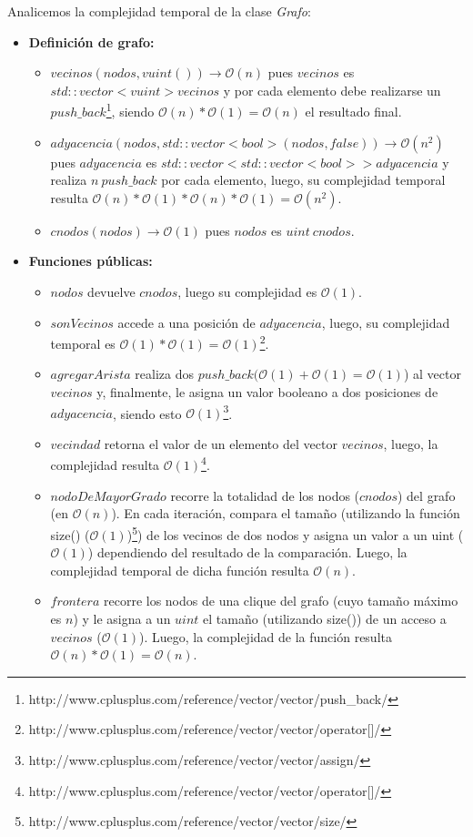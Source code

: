 \documentclass[10pt, a4paper]{article}
\begin{document}
\begin{itemize}
Analicemos la complejidad temporal de la clase \textit{Grafo}:
\begin{itemize}
\item \textbf{Definición de grafo:}
\begin{itemize}
\item $vecinos(nodos, vuint()) \rightarrow \mathcal{O}(n)$ pues $vecinos$ es $std::vector< vuint > vecinos$ y por cada elemento debe realizarse un $push\_back$\footnote{http://www.cplusplus.com/reference/vector/vector/push\_back/}, siendo $\mathcal{O}(n)*\mathcal{O}(1) = \mathcal{O}(n)$ el resultado final.
\item $adyacencia(nodos, std::vector<bool>(nodos, false)) \rightarrow \mathcal{O}(n^2)$ pues $adyacencia$ es $std::vector<std::vector<bool> > adyacencia$ y realiza $n\ push\_back$ por cada elemento, luego, su complejidad temporal resulta $\mathcal{O}(n)*\mathcal{O}(1)*\mathcal{O}(n)*\mathcal{O}(1) = \mathcal{O}(n^2)$.
\item $cnodos(nodos) \rightarrow \mathcal{O}(1)$ pues $nodos$ es $uint\ cnodos$.
\end{itemize}
\item \textbf{Funciones públicas:}
\begin{itemize}
\item $nodos$ devuelve $cnodos$, luego su complejidad es $\mathcal{O}(1)$.
\item $sonVecinos$ accede a una posición de $adyacencia$, luego, su complejidad temporal es $\mathcal{O}(1)*\mathcal{O}(1) = \mathcal{O}(1)$\footnote{http://www.cplusplus.com/reference/vector/vector/operator[]/}.
\item $agregarArista$ realiza dos $push\_back (\mathcal{O}(1) + \mathcal{O}(1) = \mathcal{O}(1)$) al vector $vecinos$ y, finalmente, le asigna un valor booleano a dos posiciones de $adyacencia$, siendo esto $\mathcal{O}(1)$\footnote{http://www.cplusplus.com/reference/vector/vector/assign/}.
\item $vecindad$ retorna el valor de un elemento del vector $vecinos$, luego, la complejidad resulta $\mathcal{O}(1)$\footnote{http://www.cplusplus.com/reference/vector/vector/operator[]/}.
\item $nodoDeMayorGrado$ recorre la totalidad de los nodos ($cnodos$) del grafo (en $\mathcal{O}(n)$). En cada iteración, compara el tamaño (utilizando la función size() ($\mathcal{O}(1)$)\footnote{http://www.cplusplus.com/reference/vector/vector/size/}) de los vecinos de dos nodos y asigna un valor a un uint ($\mathcal{O}(1)$) dependiendo del resultado de la comparación. Luego, la complejidad temporal de dicha función resulta $\mathcal{O}(n)$.
\item $frontera$ recorre los nodos de una clique del grafo (cuyo tamaño máximo es $n$) y le asigna a un $uint$ el tamaño (utilizando size()) de un acceso a $vecinos$ ($\mathcal{O}(1)$). Luego, la complejidad de la función resulta $\mathcal{O}(n)*\mathcal{O}(1) = \mathcal{O}(n)$.
\end{itemize}
\end{itemize}


\end{itemize}
\end{document}
